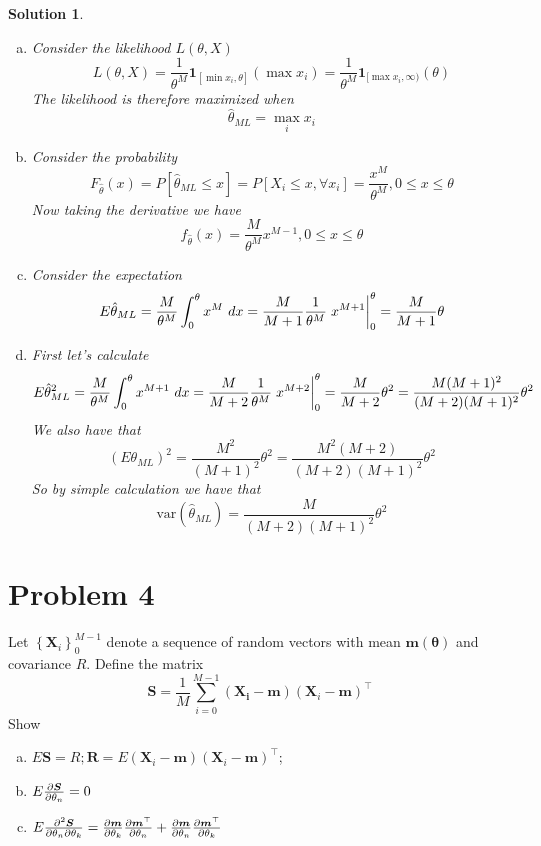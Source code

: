 \documentclass[a4paper]{article}
\newtheorem*{sol}{Solution}
\begin{document}
\begin{sol}
  \begin{enumerate}[a.]
    \item Consider the likelihood $L(\theta, X)$
  \[
    L(\theta, X) = \frac{1}{\theta^M} \bm{1}_{[\min x_i, \theta]} (\max x_i) = \frac{1}{\theta^M} \bm{1}_{[\max x_i, \infty)} (\theta)
  \]
  The likelihood is therefore maximized when
  \[
    \hat{\theta}_{ML} = \max_i x_i
  \]
    \item Consider the probability
      \[
        F_{\hat{\theta}}(x) = P[\hat{\theta}_{ML} \leq x] =  P[ X_i \leq x, \forall x_i] = \frac{x^M}{\theta^M}, 0 \leq x \leq \theta
      \]
      Now taking the derivative we have
      \[
        f_{\hat{\theta}}(x) = \frac{M}{\theta^M} x^{M-1}, 0 \leq x \leq \theta
      \]
    \item Consider the expectation
      \[
        E \hat{\theta}_{ML} =  \frac{M}{\theta^M} \int_{0}^{\theta} x^M\ dx = \frac{M}{M+1} \frac{1}{\theta^M}\eval{x^{M+1}}_0^\theta = \frac{M}{M+1} \theta
      \]
    \item First let's calculate 
      \[
        E \hat{\theta}_{ML}^2 = \frac{M}{\theta^M} \int_{0}^\theta x^{M+1}\ dx = \frac{M}{M+2} \frac{1}{\theta^M} \eval{x^{M+2}}_0^\theta = \frac{M}{M+2} \theta^2 =  \frac{M(M+1)^2 }{(M+2)(M+1)^2} \theta^2
      \]
      We also have that
      \[
        (E\theta_{ML})^2 = \frac{M^2}{(M+1)^2} \theta^2 = \frac{M^2(M+2)}{(M+2)(M+1)^2}\theta^2
      \]
      So by simple calculation we have that
      \[
        \text{var}(\hat{\theta}_{ML}) = \frac{M}{(M+2)(M+1)^2} \theta^2
      \]
  \end{enumerate}
\end{sol}

\section*{Problem 4}%
Let $\left\{\bm{X}_i  \right\}_0^{M-1}$ denote a sequence of random vectors with mean $\bm{m}(\bm{\theta})$ and covariance $R$. Define the matrix
\[
  \bm{S} = \frac{1}{M} \sum_{i=0}^{M-1} (\bm{X_i} - \bm{m})(\bm{X}_i - \bm{m})^\top
\]
Show
\begin{enumerate}[a.]
  \item $E \bm{S} = R; \bm{R} = E (\bm{X}_i - \bm{m})(\bm{X}_i - \bm{m})^\top$; 
  \item $E \pdv{\bm{S}}{\theta_n} = 0$
  \item $E \pdv{\bm{S}}{\theta_n}{\theta_k} = \pdv{\bm{m}}{\theta_k} \pdv{\bm{m}^\top}{\theta_n} + \pdv{\bm{m}}{\theta_n} \pdv{\bm{m}^\top}{\theta_k}$
\end{enumerate}
\end{document}
